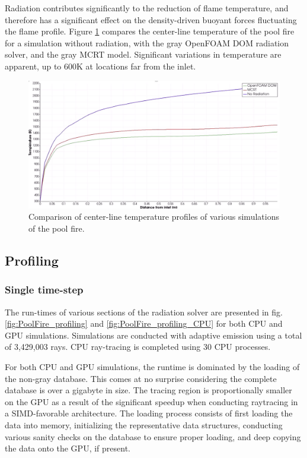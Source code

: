 Radiation contributes significantly to the reduction of flame temperature, and therefore has a significant effect on the density-driven buoyant forces fluctuating the flame profile. 
Figure \ref{fig:PoolFire_withandwithoutrad} compares the center-line temperature of the pool fire for a simulation without radiation, with the gray OpenFOAM DOM radiation solver, and the gray MCRT model. Significant variations in temperature are apparent, up to $600$K at locations far from the inlet.


\begin{figure}
\includegraphics[width=1\linewidth]{figures/ch4/PoolFire_WithandWithoutRadiation.png}
\caption{Comparison of center-line temperature profiles of various simulations of the pool fire.}
\label{fig:PoolFire_withandwithoutrad}
\end{figure}

\subsection{Profiling}
\subsubsection{Single time-step}
The run-times of various sections of the radiation solver are presented in fig. \ref{fig:PoolFire_profiling} and \ref{fig:PoolFire_profiling_CPU} for both CPU and GPU simulations. Simulations are conducted with adaptive emission using a total of 3,429,003 rays.
CPU ray-tracing is completed using 30 CPU processes. 

For both CPU and GPU simulations, the runtime is dominated by the loading of the non-gray database. This comes at no surprise considering the complete database is over a gigabyte in size. 
The tracing region is proportionally smaller on the GPU as a result of the significant speedup when conducting raytracing in a SIMD-favorable architecture.
The loading process consists of first loading the data into memory, initializing the representative data structures, conducting various sanity checks on the database to ensure proper loading, and deep copying the data onto the GPU, if present.

